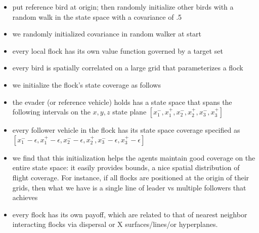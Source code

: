 \begin{itemize}
	\item put reference bird at origin; then randomly initialize other birds with a random walk in the state space with a covariance of .5~\cite{LekanCASE2016Paper}
	\item we randomly initialized covariance in random walker at start
	\item every local flock has its own value function governed by a target set
	\item every bird is spatially correlated on a large grid that parameterizes a flock
\end{itemize}
%
\begin{itemize}
	\item we initialize the flock's state coverage as follows
	\item the evader (or reference vehicle) holds has a state space that spans the following intervals on the $x,y,z$ state plane
	$[x_1^-, x_1^+, x_2^-, x_2^+, x_3^-, x_3^+]$
	\item every follower vehicle in the flock has its state space coverage specified as
	$[x_1^- -\epsilon, x_1^+ - \epsilon, x_2^- -\epsilon, x_2^+, x_3^- -\epsilon, x_3^+ - \epsilon]$
	\item we find that this initialization helps the agents maintain good coverage on the entire state space: it easily provides bounds, a nice spatial distribution of flight coverage. For instance, if all flocks are positioned at the origin of their grids, then what we have is a single line of leader vs multiple followers that achieves
	\item every flock has its own payoff, which are related to that of nearest neighbor interacting flocks via dispersal or X surfaces/lines/or hyperplanes.
\end{itemize}


